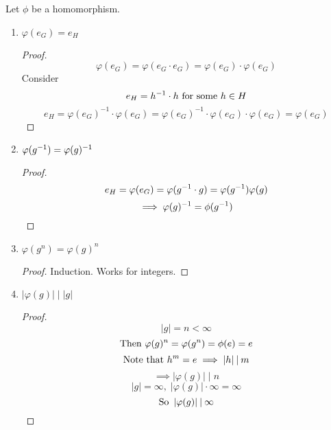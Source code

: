 \documentclass[12pt]{article}
\newcommand{\order}[1]{\left\lvert#1\right\rvert}
\newcommand{\divides}{\mathbin|}
\begin{document}
\bboxlem
\begin{lem}\label{lem:properties_of_homs}
    Let \(\phi\) be a homomorphism.
    \begin{enumerate}
        \item \(\varphi(e_G)=e_H\)
            \bboxproof
            \begin{proof}
                \[
                    \varphi(e_G)=\varphi(e_G\cdot e_G)
                    =\varphi(e_G)\cdot\varphi(e_G)
                \]
                Consider
                \[
                    e_H=h^{-1}\cdot h\text{ for some }h\in H
                \]
                \[
                    e_H=\varphi(e_G)^{-1}\cdot\varphi(e_G)
                    =\varphi(e_G)^{-1}\cdot\varphi(e_G)\cdot\varphi(e_G)
                    =\varphi(e_G)
                \]
            \end{proof}
            \ebox
        \item \(\varphi(g^{-1})=\varphi(g)^{-1}\)
            \bboxproof
            \begin{proof}
                \[
                    e_H=\varphi(e_G)=\varphi(g^{-1}\cdot g)=\varphi(g^{-1})\varphi(g)
                \]
                \[
                    \implies\varphi(g)^{-1}=\phi(g^{-1})
                \]
            \end{proof}
            \ebox
        \item \(\varphi(g^n)=\varphi(g)^n\)
            \bboxproof
            \begin{proof}
                Induction. Works for integers.
            \end{proof}
            \ebox
        \item \(\order{\varphi(g)}\divides\order{g}\)
            \bboxproof
            \begin{proof}
                \[
                    \order g=n<\infty
                \]
                \[
                    \text{Then }\varphi(g)^n=\varphi(g^n)=\phi(e)=e
                \]
                \[
                    \T{Note that }h^m=e\implies \order{h}\divides m
                \]
                \[
                    \implies\order{\varphi(g)}\divides n
                \]
                \[
                    \order{g}=\infty,\;\order{\varphi(g)}\cdot\infty=\infty
                \]
                \[
                    \T{So }\order{\varphi(g)}\divides\infty
                \]
            \end{proof}
            \ebox

    \end{enumerate}
\end{lem}
\ebox

\end{document}
